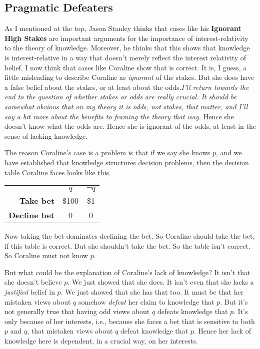 \subsection{Pragmatic Defeaters}

As I mentioned at the top, Jason Stanley thinks that cases like his \textbf{Ignorant High Stakes} are important arguments for the importance of interest-relativity to the theory of knowledge. Moreover, he thinks that this shows that knowledge is interest-relative in a way that doesn't merely reflect the interest relativity of belief. I now think that cases like Coraline show that is correct. It is, I guess, a little misleading to describe Coraline as \textit{ignorant} of the stakes. But she does have a false belief about the stakes, or at least about the odds.\textit{I'll return towards the end to the question of whether stakes or odds are really crucial. It should be somewhat obvious that on my theory it is odds, not stakes, that matter, and I'll say a bit more about the benefits to framing the theory that way.} Hence she doesn't know what the odds are. Hence she is ignorant of the odds, at least in the sense of lacking knowledge.

The reason Coraline's case is a problem is that if we say she knows \(p\), and we have established that knowledge structures decision problems, then the decision table Coraline faces looks like this.

\begin{center}
\begin{tabular}{r c c}
 & \textbf{\(q\)} & \textbf{\(\neg q\)}  \\
\textbf{Take bet} & \$100 & \$1  \\
\textbf{Decline bet} & 0 & 0  \\
\end{tabular}
\end{center}

\noindent Now taking the bet dominates declining the bet. So Coraline should take the bet, if this table is correct. But she shouldn't take the bet. So the table isn't correct. So Coraline must not know \(p\).

But what could be the explanation of Coraline's lack of knowledge? It isn't that she doesn't believe \(p\). We just showed that she does. It isn't even that she lacks a \textit{justified} belief in \(p\). We just showed that she has that too. It must be that her mistaken views about \(q\) somehow \textit{defeat} her claim to knowledge that \(p\). But it's not generally true that having odd views about \(q\) defeats knowledge that \(p\). It's only because of her interests, i.e., because she faces a bet that is sensitive to both \(p\) and \(q\), that mistaken views about \(q\) defeat knowledge that \(p\). Hence her lack of knowledge here is dependent, in a crucial way, on her interests.

